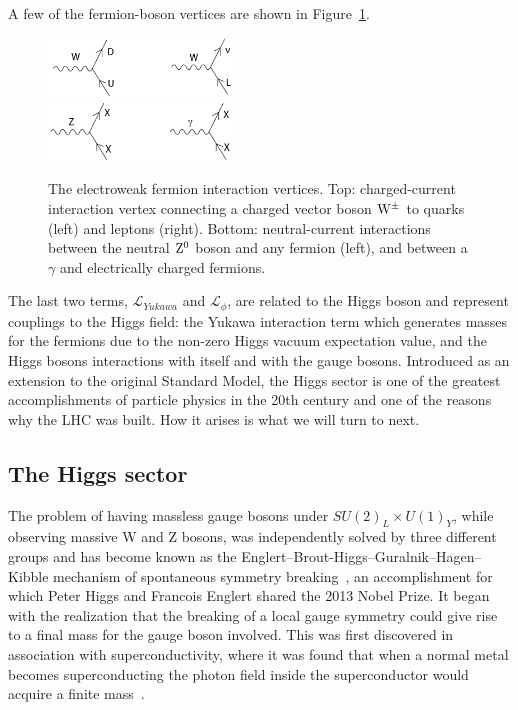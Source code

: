 A few of the fermion-boson vertices are shown in Figure~\ref{fig:theory:weakfermionint}.\par
  \begin{figure}[h!]
  \centering
  \includegraphics[width=0.45\textwidth]{figures/theory/ew_ch.png}\\
  \includegraphics[width=0.45\textwidth]{figures/theory/ew_neu.png}
  \caption{The electroweak fermion interaction vertices. Top: charged-current interaction vertex connecting a charged vector boson $\mathrm{W}^{\pm}$ to quarks (left) and leptons (right). Bottom: neutral-current interactions between the neutral $\mathrm{Z}^0$ boson and any fermion (left), and between a $\gamma$ and electrically charged fermions.}
  \label{fig:theory:weakfermionint}
  \end{figure}
The last two terms, $\mathcal{L}_{Yukawa}$ and $\mathcal{L}_{\phi}$, are related to the Higgs boson and represent couplings to the Higgs field: the Yukawa interaction term which generates masses for the fermions due to the non-zero Higgs vacuum expectation value, and the Higgs bosons interactions with itself and with the gauge bosons. Introduced as an extension to the original Standard Model, the Higgs sector is one of the greatest accomplishments of particle physics in the 20th century and one of the reasons why the LHC was built. How it arises is what we will turn to next.

\subsection{The Higgs sector}
\label{sec:theory:higgs}
The problem of having massless gauge bosons under $SU(2)_L \times U(1)_Y$, while observing massive W and Z bosons, was independently solved by three different groups and has become known as the Englert–Brout-Higgs–Guralnik–Hagen–Kibble mechanism of spontaneous symmetry breaking~\cite{PhysRevLett.13.321,PhysRevLett.13.508,PhysRevLett.13.585}, an accomplishment for which Peter Higgs and Francois Englert shared the 2013 Nobel Prize.\newline
It began with the realization that the breaking of a local gauge symmetry could give rise to a final mass for the gauge boson involved. This was first discovered in association with superconductivity, where it was found that when a normal metal becomes superconducting the photon field inside the superconductor would acquire a finite mass~\cite{PhysRev.110.827}.

